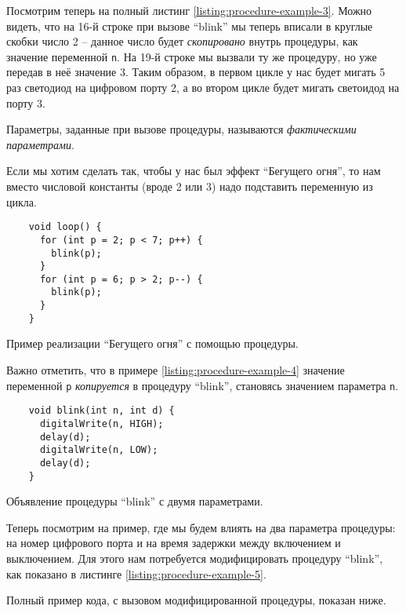 \documentclass[../sparc.tex]{subfiles}
\begin{document}
Посмотрим теперь на полный листинг \ref{listing:procedure-example-3}.  Можно
видеть, что на 16-й строке при вызове ``blink'' мы теперь вписали в круглые
скобки число 2 -- данное число будет \emph{скопировано} внутрь процедуры, как
значение переменной \texttt{n}.  На 19-й строке мы вызвали ту же
процедуру, но уже передав в неё значение 3.  Таким образом, в первом цикле у нас
будет мигать 5 раз светодиод на цифровом порту 2, а во втором цикле будет мигать
светоидод на порту 3.

Параметры, заданные при вызове процедуры, называются \emph{фактическими
параметрами}.

Если мы хотим сделать так, чтобы у нас был эффект ``Бегущего огня'', то нам
вместо числовой константы (вроде 2 или 3) надо подставить переменную из цикла.

\begin{listing}[H]
  \begin{verbatim}
    void loop() {
      for (int p = 2; p < 7; p++) {
        blink(p);
      }
      for (int p = 6; p > 2; p--) {
        blink(p);
      }
    }
  \end{verbatim}
  \label{listing:procedure-example-4}
  \caption{Пример реализации ``Бегущего огня'' с помощью процедуры.}
\end{listing}

Важно отметить, что в примере \ref{listing:procedure-example-4} значение
переменной \texttt{p} \emph{копируется} в процедуру ``blink'',
становясь значением параметра \texttt{n}.

\begin{listing}[H]
  \begin{verbatim}
    void blink(int n, int d) {
      digitalWrite(n, HIGH);
      delay(d);
      digitalWrite(n, LOW);
      delay(d);
    }
  \end{verbatim}
  \label{listing:procedure-example-5}
  \caption{Объявление процедуры ``blink'' с двумя параметрами.}
\end{listing}

Теперь посмотрим на пример, где мы будем влиять на два параметра процедуры: на
номер цифрового порта и на время задержки между включением и выключением.  Для
этого нам потребуется модифицировать процедуру ``blink'', как показано в
листинге \ref{listing:procedure-example-5}.

Полный пример кода, с вызовом модифицированной процедуры, показан ниже.
\end{document}
